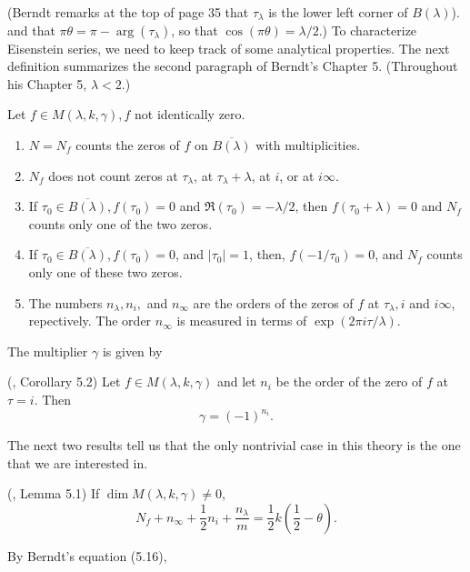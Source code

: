 \documentclass{article}
\begin{document}
(Berndt remarks at the top of page 35 that
$\tau_{\lambda}$ is the lower left corner
of $B(\lambda)$). and that
$\pi \theta = \pi - \arg(\tau_{\lambda})$,
so that $\cos (\pi \theta) = \lambda/2$.)
\newline \newline \noindent
To characterize Eisenstein series,
we need to keep track of some analytical
properties. The next definition summarizes
the second paragraph  of
Berndt's Chapter 5.
(Throughout his Chapter 5, $\lambda < 2$.)
\begin{definition}
Let $f \in M(\lambda, k, \gamma), f$
not identically zero.
    \begin{enumerate}
    \item
    $N = N_f$ counts the zeros of $f$ on 
    $\overline{B(\lambda)}$  with multiplicities.
    \item $N_f$ does not count zeros
    at $\tau_{\lambda}$, at $\tau_{\lambda} + \lambda$, 
    at $i$, or at $i\infty$.
    \item 
    If $\tau_0 \in 
    \overline{B(\lambda)}, f(\tau_0) = 0$
    and
   $\Re (\tau_0) = -\lambda/2$, 
    then $f(\tau_0 + \lambda) = 0$ and
    $N_f$ counts only one of the two zeros.
    \item If $\tau_0 \in 
    \overline{B(\lambda)}, f(\tau_0) = 0$,
    and $|\tau_0| = 1$, then,
     $f(-1/\tau_0) = 0$,
    and $N_f$ counts only one 
    of these two zeros.
    \item  The numbers $n_{\lambda}, n_i,$
    and $n_{\infty}$ are the orders of the
    zeros of $f$ at $\tau_{\lambda},
    i$ and $i\infty$, repectively.
    The order $n_{\infty}$ is measured in terms of
    $\exp(2 \pi i \tau/\lambda)$.
\end{enumerate}
\end{definition}
\noindent
The multiplier $\gamma$ is given by
\begin{theorem}
(\cite{berndt2008hecke}, Corollary 5.2)
Let $f \in M(\lambda,k,\gamma)$ and 
let $n_i$ be the order of the zero
of $f$ at $\tau = i$.
Then
$$
\gamma= (-1)^{n_i}.
$$
\end{theorem}
\noindent
The next two results 
tell us that the only nontrivial
case in this theory is the one 
that we are interested in.
\begin{theorem} 
(\cite{berndt2008hecke}, Lemma 5.1)
If $\dim M(\lambda,k,\gamma)
\neq 0$,
$$
N_f + n_{\infty} + \frac 12 n_i + 
\frac {n_{\lambda}}m =
\frac 12 k \left ( \frac 12 - \theta \right).
$$
\end{theorem}
\noindent
By Berndt's equation (5.16), 
\end{document}
